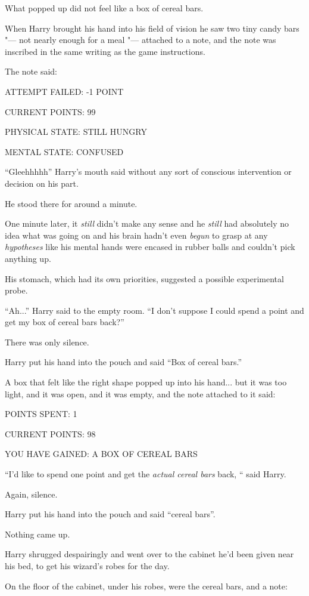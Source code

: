 What popped up did not feel like a box of cereal bars.

When Harry brought his hand into his field of vision he saw two tiny
candy bars "--- not nearly enough for a meal "--- attached to a note, and the
note was inscribed in the same writing as the game instructions.

The note said:

ATTEMPT FAILED: -1 POINT

CURRENT POINTS: 99

PHYSICAL STATE: STILL HUNGRY

MENTAL STATE: CONFUSED

``Gleehhhhh'' Harry's mouth said without any sort of conscious
intervention or decision on his part.

He stood there for around a minute.

One minute later, it \emph{still} didn't make any sense and he
\emph{still} had absolutely no idea what was going on and his brain
hadn't even \emph{begun} to grasp at any \emph{hypotheses} like his
mental hands were encased in rubber balls and couldn't pick anything up.

His stomach, which had its own priorities, suggested a possible
experimental probe.

``Ah...'' Harry said to the empty room. ``I don't suppose I could
spend a point and get my box of cereal bars back?''

There was only silence.

Harry put his hand into the pouch and said ``Box of cereal bars.''

A box that felt like the right shape popped up into his hand... but
it was too light, and it was open, and it was empty, and the note
attached to it said:

POINTS SPENT: 1

CURRENT POINTS: 98

YOU HAVE GAINED: A BOX OF CEREAL BARS

``I'd like to spend one point and get the \emph{actual cereal bars} back,
`` said Harry.

Again, silence.

Harry put his hand into the pouch and said ``cereal bars''.

Nothing came up.

Harry shrugged despairingly and went over to the cabinet he'd been given
near his bed, to get his wizard's robes for the day.

On the floor of the cabinet, under his robes, were the cereal bars, and
a note:

